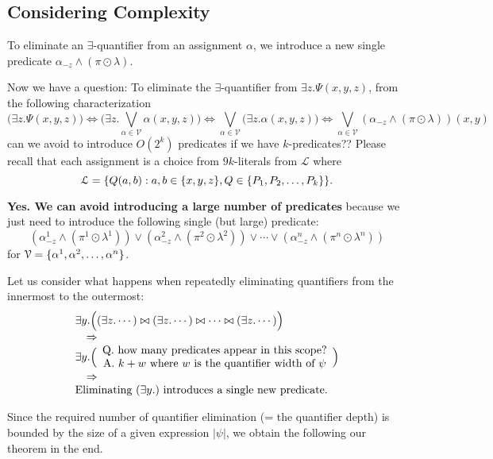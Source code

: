 \subsection{Considering Complexity}
To eliminate an $\exists$-quantifier from an assignment $\alpha$, we introduce a new single predicate $\alpha_{-z} \land (\pi \odot \lambda)$.

Now we have a question:
To eliminate the $\exists$-quantifier from $\exists z. \Psi(x, y, z)$,
from the following characterization
$$
\biggl(\exists z. \Psi(x,y, z)\biggr)
\iff \biggl(\exists z. \bigvee_{\alpha \in \mathcal{V}} \alpha(x, y, z)\biggr)
\iff \bigvee_{\alpha \in \mathcal{V}} \biggl(\exists z. \alpha(x, y, z)\biggr)
\iff \bigvee_{\alpha \in \mathcal{V}} (\alpha_{-z} \land (\pi \odot \lambda))(x, y)
$$
can we avoid to introduce $O(2^k)$ predicates if we have $k$-predicates??
Please recall that each assignment is a choice from $9k$-literals from $\mathcal{L}$ where
$$
\mathcal{L} = \{ Q(a, b) : a, b \in \{x, y, z\}, Q \in \{P_1, P_2, \ldots, P_k\} \}.
$$

\textbf{Yes. We can avoid introducing a large number of predicates} because
we just need to introduce the following single (but large) predicate:
$$
(\alpha^1_{-z} \land (\pi^1 \odot \lambda^1)) \lor (\alpha^2_{-z} \land (\pi^2 \odot \lambda^2)) \lor \cdots \lor (\alpha^n_{-z} \land (\pi^n \odot \lambda^n))
$$
for $\mathcal{V} = \{ \alpha^1, \alpha^2, \ldots, \alpha^n \}$.

Let us consider what happens when repeatedly eliminating quantifiers from the innermost to the outermost:
$$
\begin{array}{l}
\exists y.
\Bigl(
(\exists z. \cdots) \bowtie (\exists z. \cdots) \bowtie \cdots \bowtie (\exists z. \cdots)
\Bigr) \\
\quad \Rightarrow \\
\exists y. \Bigl(
\begin{array}{c}
\text{Q. how many predicates appear in this scope?} \\
\text{A. $k + w$ where $w$ is the quantifier width of $\psi$}
\end{array}
\Bigr) \\
\quad \Rightarrow \\
\text{Eliminating $(\exists y.)$ introduces a single new predicate.}
\end{array}
$$

Since the required number of quantifier elimination (= the quantifier depth) is bounded by the size of a given expression $|\psi|$, we obtain the following our theorem in the end.

